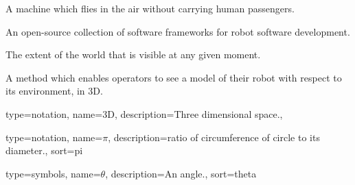 
 {
  A machine which flies in the air without carrying human passengers.
}

 {
  An open-source collection of software frameworks for robot software development.
}

 {
  The extent of the world that is visible at any given moment.
}

 {
  A method which enables operators to see a model of their robot with respect to its environment, in 3D.
}


 {
  type=notation,
  name={3D},
  description={Three dimensional space.},
}

 {
  type=notation,
  name={\ensuremath{\pi}},
  description={ratio of circumference of circle to its diameter.},
  sort=pi
}

 {
  type=symbols,
  name={\ensuremath{\theta}},
  description={An angle.},
  sort=theta
}
